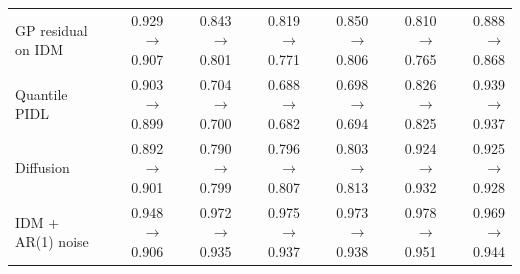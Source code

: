 \begin{table}[htbp]
\begin{tabular}{lrrrrrr}
GP residual on IDM & 0.929 $\rightarrow$ 0.907 & 0.843 $\rightarrow$ 0.801 & 0.819 $\rightarrow$ 0.771 & 0.850 $\rightarrow$ 0.806 & 0.810 $\rightarrow$ 0.765 & 0.888 $\rightarrow$ 0.868 \\
Quantile PIDL & 0.903 $\rightarrow$ 0.899 & 0.704 $\rightarrow$ 0.700 & 0.688 $\rightarrow$ 0.682 & 0.698 $\rightarrow$ 0.694 & 0.826 $\rightarrow$ 0.825 & 0.939 $\rightarrow$ 0.937 \\
Diffusion & 0.892 $\rightarrow$ 0.901 & 0.790 $\rightarrow$ 0.799 & 0.796 $\rightarrow$ 0.807 & 0.803 $\rightarrow$ 0.813 & 0.924 $\rightarrow$ 0.932 & 0.925 $\rightarrow$ 0.928 \\
IDM + AR(1) noise & 0.948 $\rightarrow$ 0.906 & 0.972 $\rightarrow$ 0.935 & 0.975 $\rightarrow$ 0.937 & 0.973 $\rightarrow$ 0.938 & 0.978 $\rightarrow$ 0.951 & 0.969 $\rightarrow$ 0.944 \\
\bottomrule
\end{tabular}
\end{table}
